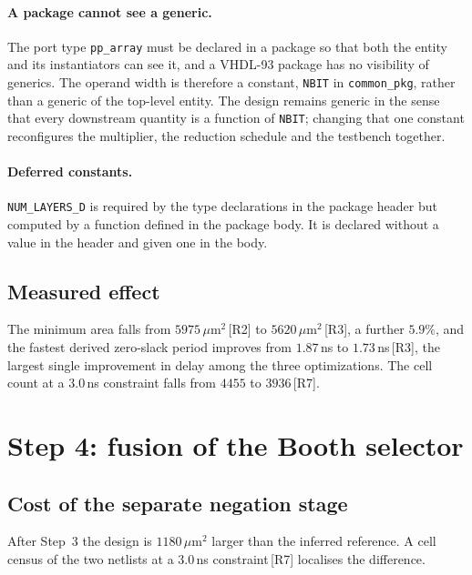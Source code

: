 \documentclass[11pt,a4paper]{article}
\newcommand{\umarea}{\ensuremath{\,\mu\mathrm{m}^{2}}}
\newcommand{\src}[1]{\,{\footnotesize\color{accent}[#1]}}
\begin{document}
\paragraph{A package cannot see a generic.} The port type \texttt{pp\_array}
must be declared in a package so that both the entity and its instantiators can
see it, and a VHDL-93 package has no visibility of generics. The operand width
is therefore a constant, \texttt{NBIT} in \texttt{common\_pkg}, rather than a
generic of the top-level entity. The design remains generic in the sense that
every downstream quantity is a function of \texttt{NBIT}; changing that one
constant reconfigures the multiplier, the reduction schedule and the testbench
together.

\paragraph{Deferred constants.} \texttt{NUM\_LAYERS\_D} is required by the type
declarations in the package header but computed by a function defined in the
package body. It is declared without a value in the header and given one in the
body.

\subsection{Measured effect}

The minimum area falls from $5975\umarea$\src{R2} to
$5620\umarea$\src{R3}, a further $5.9\%$, and the fastest derived
zero-slack period improves from $1.87$\,ns to $1.73$\,ns\src{R3}, the largest
single improvement in delay among the three optimizations. The cell count at a
$3.0$\,ns constraint falls from $4455$ to $3936$\src{R7}.

\section{Step 4: fusion of the Booth selector}
\label{sec:opt3}

\subsection{Cost of the separate negation stage}

After Step~3 the design is $1180\umarea$ larger than the
inferred reference. A cell census of the two netlists at a $3.0$\,ns
constraint\src{R7} localises the difference.
\end{document}
